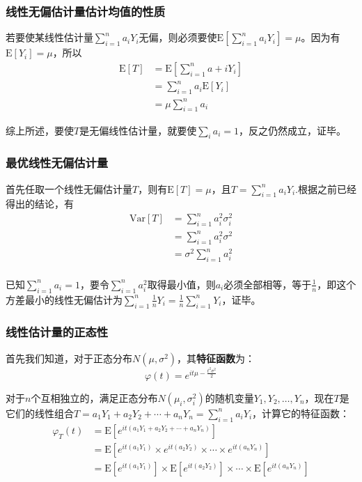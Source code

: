 \documentclass[UTF8]{ctexbook}
\begin{document}
\subsubsection{线性无偏估计量估计均值的性质}
\label{proof3}
若要使某线性估计量$\sum_{i=1}^na_iY_i$无偏，则必须要使$\mathrm{E}[\sum_{i=1}^na_iY_i]=\mu$。因为有$\mathrm{E}[Y_i]=\mu$，所以
\begin{align*}
	\mathrm{E}[T]&=\mathrm{E}[\sum_{i=1}^na+iY_i]\\
	&=\sum_{i=1}^na_i\mathrm{E}[Y_i]\\
	&=\mu\sum_{i=1}^na_i
\end{align*}

综上所述，要使$T$是无偏线性估计量，就要使$\sum_{i}a_i=1$，反之仍然成立，证毕。
\subsubsection{最优线性无偏估计量}
\label{proof4}
首先任取一个线性无偏估计量$T$，则有$\mathrm{E}[T]=\mu$，且$T=\sum_{i=1}^na_iY_i$.根据之前已经得出的结论，有
\begin{align*}
	\mathrm{Var}[T]&=\sum_{i=1}^na_i^2\sigma_i^2\\
	&=\sum_{i=1}^na_i^2\sigma^2\\
	&=\sigma^2\sum_{i=1}^na_i^2\\
\end{align*}

已知$\sum_{i=1}^na_i=1$，要令$\sum_{i=1}^na_i^2$取得最小值，则$a_i$必须全部相等，等于$\frac{1}{n}$，即这个方差最小的线性无偏估计为$\sum_{i=1}^n\frac{1}{n}Y_i=\frac{1}{n}\sum_{i=1}^nY_i$，证毕。

\subsubsection{线性估计量的正态性}
\label{proof5}
首先我们知道，对于正态分布$N(\mu, \sigma^2)$，其\textbf{特征函数}为：
\[
	\varphi(t)=e^{it\mu-\frac{t^2\sigma^2}{2}}
\]

对于$n$个互相独立的，满足正态分布$N(\mu_i,\sigma_i^2)$的随机变量$Y_1,Y_2,\dots,Y_n$，现在$T$是它们的线性组合$T=a_1Y_1+a_2Y_2+\cdots+a_nY_n=\sum_{i=1}^na_iY_i$，计算它的特征函数：
\[
	\begin{aligned}
	\varphi_T(t)&=\mathrm E[e^{it(a_1Y_1+a_2Y_2+\cdots+a_nY_n)}]\\
	&=\mathrm E[e^{it(a_1Y_1)}\times e^{it(a_2Y_2)}\times \cdots \times e^{it(a_nY_n)}]\\
	&=\mathrm E[e^{it(a_1Y_1)}]\times \mathrm E[e^{it(a_2Y_2)}] \times \cdots \times \mathrm E[e^{it(a_nY_n)}]\\
	\end{aligned}
\]
\end{document}
